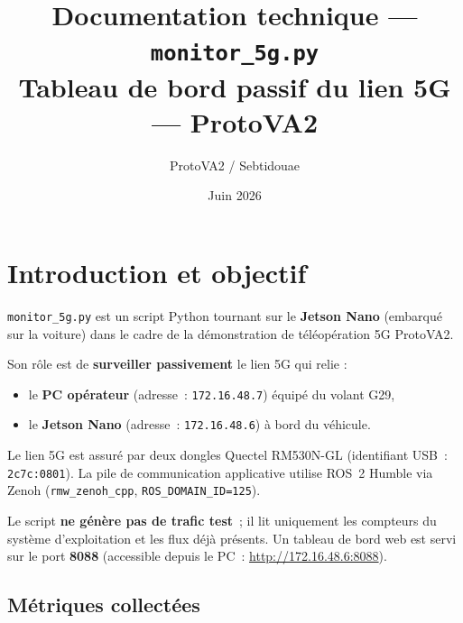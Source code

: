 \documentclass[a4paper,12pt]{article}
\title{\textbf{Documentation technique — \texttt{monitor\_5g.py}}\\
       \large Tableau de bord passif du lien 5G — ProtoVA2}
\author{ProtoVA2 / Sebtidouae}
\date{Juin 2026}
\begin{document}
\maketitle
\tableofcontents
\newpage

\section{Introduction et objectif}

\texttt{monitor\_5g.py} est un script Python tournant sur le \textbf{Jetson Nano} (embarqué
sur la voiture) dans le cadre de la démonstration de téléopération 5G ProtoVA2.

Son rôle est de \textbf{surveiller passivement} le lien 5G qui relie :
\begin{itemize}
  \item le \textbf{PC opérateur} (adresse~: \texttt{172.16.48.7}) équipé du volant G29,
  \item le \textbf{Jetson Nano} (adresse~: \texttt{172.16.48.6}) à bord du véhicule.
\end{itemize}

Le lien 5G est assuré par deux dongles Quectel RM530N-GL (identifiant USB~:
\texttt{2c7c:0801}). La pile de communication applicative utilise ROS~2 Humble via Zenoh
(\texttt{rmw\_zenoh\_cpp}, \texttt{ROS\_DOMAIN\_ID=125}).

Le script \textbf{ne génère pas de trafic test}~; il lit uniquement les compteurs du système
d'exploitation et les flux déjà présents. Un tableau de bord web est servi sur le port
\textbf{8088} (accessible depuis le PC~: \href{http://172.16.48.6:8088}{http://172.16.48.6:8088}).

\subsection{Métriques collectées}
\end{document}
